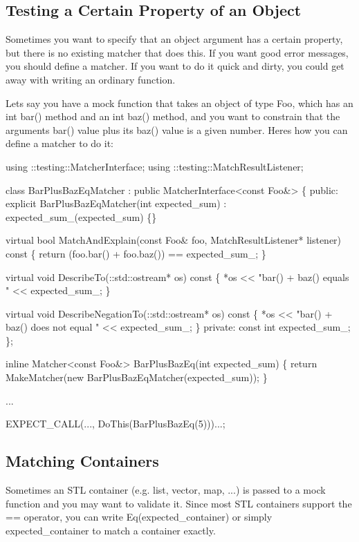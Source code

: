 \subsection*{Testing a Certain Property of an Object}

Sometimes you want to specify that an object argument has a certain property, but there is no existing matcher that does this. If you want good error messages, you should define a matcher. If you want to do it quick and dirty, you could get away with writing an ordinary function.

Let\textquotesingle{}s say you have a mock function that takes an object of type {\ttfamily Foo}, which has an {\ttfamily int bar()} method and an {\ttfamily int baz()} method, and you want to constrain that the argument\textquotesingle{}s {\ttfamily bar()} value plus its {\ttfamily baz()} value is a given number. Here\textquotesingle{}s how you can define a matcher to do it\+:


\begin{DoxyCode}
using ::testing::MatcherInterface;
using ::testing::MatchResultListener;

class BarPlusBazEqMatcher : public MatcherInterface<const Foo&> \{
 public:
  explicit BarPlusBazEqMatcher(int expected\_sum)
      : expected\_sum\_(expected\_sum) \{\}

  virtual bool MatchAndExplain(const Foo& foo,
                               MatchResultListener* listener) const \{
    return (foo.bar() + foo.baz()) == expected\_sum\_;
  \}

  virtual void DescribeTo(::std::ostream* os) const \{
    *os << "bar() + baz() equals " << expected\_sum\_;
  \}

  virtual void DescribeNegationTo(::std::ostream* os) const \{
    *os << "bar() + baz() does not equal " << expected\_sum\_;
  \}
 private:
  const int expected\_sum\_;
\};

inline Matcher<const Foo&> BarPlusBazEq(int expected\_sum) \{
  return MakeMatcher(new BarPlusBazEqMatcher(expected\_sum));
\}

...

  EXPECT\_CALL(..., DoThis(BarPlusBazEq(5)))...;
\end{DoxyCode}


\subsection*{Matching Containers}

Sometimes an S\+TL container (e.\+g. list, vector, map, ...) is passed to a mock function and you may want to validate it. Since most S\+TL containers support the {\ttfamily ==} operator, you can write {\ttfamily Eq(expected\+\_\+container)} or simply {\ttfamily expected\+\_\+container} to match a container exactly.

